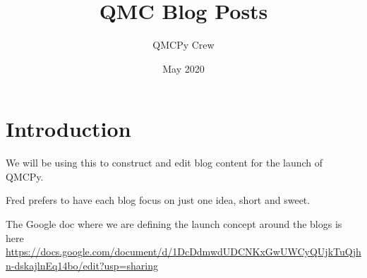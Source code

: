 \documentclass{article}
\title{QMC Blog Posts}
\author{QMCPy Crew}
\date{May 2020}
\newcommand{\blogpost}[5][{}]{\newpage%
\section{#2 {\color{teal}#1}}%
\begin{refsection}%
    \label{#4}%
	Author(s): #3 \newline \newline%
\printbibliography[heading=subbibliography]
\end{refsection}
} %
\theoremstyle{definition}
\begin{document}
\maketitle

\setcounter{tocdepth}{1}
\tableofcontents

\section*{Introduction}

We will be using this to construct and edit blog content for the launch of QMCPy.

Fred prefers to have each blog focus on just one idea, short and sweet.

The Google doc where we are defining the launch concept around the blogs is here \url{https://docs.google.com/document/d/1DcDdmwdUDCNKxGwUWCyQUjkTuQjhn-dskajlnEq14bo/edit?usp=sharing}











\end{document}

